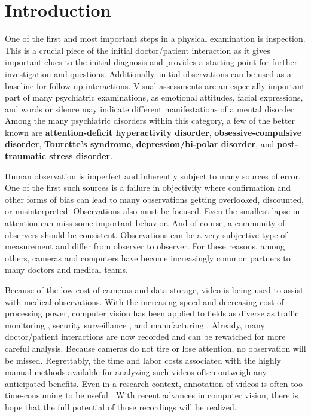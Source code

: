 \documentclass[11pt]{article}
\begin{document}
\section{Introduction}
\noindent
One of the first and most important steps in a physical examination is inspection. This is a crucial piece of the initial doctor/patient interaction as it gives important clues to the initial diagnosis and provides a starting point for further investigation and questions. Additionally, initial observations can be used as a baseline for follow-up interactions. Visual assessments are an especially important part of many psychiatric examinations, as emotional attitudes, facial expressions, and words or silence may indicate different manifestations of a mental disorder. Among the many psychiatric disorders within this category, a few of the better known are \textbf{attention-deficit hyperactivity disorder}, \textbf{obsessive-compulsive disorder}, \textbf{Tourette's syndrome}, \textbf{depression/bi-polar disorder}, and \textbf{post-traumatic stress disorder}.

Human observation is imperfect and inherently subject to many sources of error. One of the first such sources is a failure in objectivity where confirmation and other forms of bias can lead to many observations getting overlooked, discounted, or misinterpreted. Observations also must be focused. Even the smallest lapse in attention can miss some important behavior. And of course, a community of observers should be consistent. Observations can be a very subjective type of measurement and differ from observer to observer. For these reasons, among others, cameras and computers have become increasingly common partners to many doctors and medical teams.

Because of the low cost of cameras and data storage, video is being used to assist with medical observations. With the increasing speed and decreasing cost of processing power, computer vision has been applied to fields as diverse as traffic monitoring \cite{Gupte}, security surveillance \cite{bird2006}, and manufacturing \cite{saurez2018}. Already, many doctor/patient interactions are now recorded and can be rewatched for more careful analysis. Because cameras do not tire or lose attention, no observation will be missed. Regrettably, the time and labor costs associated with the highly manual methods available for analyzing such videos often outweigh any anticipated benefits. Even in a research context, annotation of videos is often too time-consuming to be useful \cite{fasching2016} \cite{walkup1992}. With recent advances in computer vision, there is hope that the full potential of those recordings will be realized.
\end{document}
